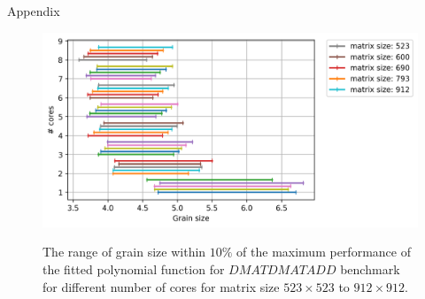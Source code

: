 \documentclass[10pt]{beamer}
\begin{document}
\begin{frame}{Appendix}
	\begin{outline}	
		\begin{figure}[H]
			\includegraphics[scale=.5]{images/polyfit/fig_523-912_peak_range_all.png} \label{fig27}	\caption{The range of grain size within $10\%$ of the maximum performance of the fitted polynomial function for $DMATDMATADD$ benchmark for different number of cores for matrix size $523\times523$ to $912\times912$.}		
		\end{figure} 
	\end{outline}
\end{frame}
\end{document}
